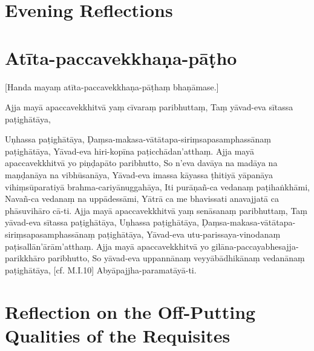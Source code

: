 \chapter{Evening Reflections}

\chapter{Atīta-paccavekkhaṇa-pāṭho}

[Handa mayaṃ atīta-paccavekkhaṇa-pāṭhaṃ bhaṇāmase.]

Ajja mayā apaccavekkhitvā yaṃ cīvaraṃ
paribhuttaṃ,
Taṃ yāvad-eva sītassa paṭighātāya,

Uṇhassa paṭighātāya,
Ḍaṃsa-makasa-vātātapa-siriṃsapasamphassānaṃ paṭighātāya,
Yāvad-eva hiri-kopīna paṭicchādan’atthaṃ.
Ajja mayā apaccavekkhitvā yo piṇḍapāto
paribhutto,
So n’eva davāya na madāya na maṇḍanāya na
vibhūsanāya,
Yāvad-eva imassa kāyassa ṭhitiyā yāpanāya
vihiṃsūparatiyā brahma-cariyānuggahāya,
Iti purāṇañ-ca vedanaṃ paṭihaṅkhāmi,
Navañ-ca vedanaṃ na uppādessāmi,
Yātrā ca me bhavissati anavajjatā ca phāsuvihāro cā-ti.
Ajja mayā apaccavekkhitvā yaṃ senāsanaṃ
paribhuttaṃ,
Taṃ yāvad-eva sītassa paṭighātāya,
Uṇhassa paṭighātāya,
Ḍaṃsa-makasa-vātātapa-siriṃsapasamphassānaṃ paṭighātāya,
Yāvad-eva utu-parissaya-vinodanaṃ
paṭisallān’ārām’atthaṃ.
Ajja mayā apaccavekkhitvā yo gilāna-paccayabhesajja-parikkhāro paribhutto,
So yāvad-eva uppannānaṃ veyyābādhikānaṃ
vedanānaṃ paṭighātāya,
[cf. M.I.10]
Abyāpajjha-paramatāyā-ti.

\chapter{Reflection on the Off-Putting Qualities of the Requisites}

\begin{leader}
\end{leader}

